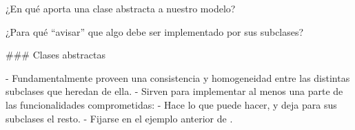 \begin{rboxx}[.9\textwidth]{}
¿En qué aporta una clase abstracta a nuestro modelo?
\end{rboxx}

\begin{rboxx}[.9\textwidth]{}
¿Para qué ``avisar'' que algo debe ser implementado por sus subclases?
\end{rboxx}

### Clases abstractas


- Fundamentalmente proveen una consistencia y homogeneidad entre las distintas subclases que heredan de ella.
- Sirven para implementar al menos una parte de las funcionalidades comprometidas:
    - Hace lo que puede hacer, y deja para sus subclases el resto.
    - Fijarse en el ejemplo anterior de .


